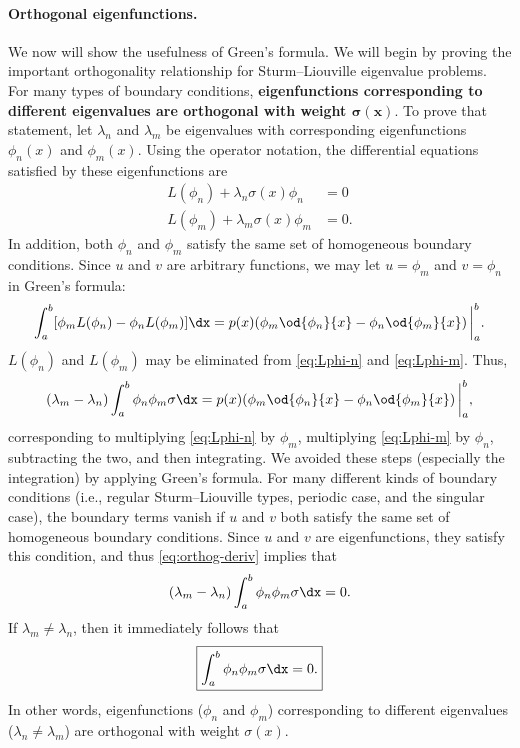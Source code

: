 \paragraph{Orthogonal eigenfunctions.}
We now will show the usefulness of Green's formula.  We will begin by proving the important orthogonality relationship for Sturm--Liouville eigenvalue problems.  For many types of boundary conditions, \textbf{eigenfunctions corresponding to different eigenvalues are orthogonal with weight $\bm{\sigma(x)}$}.  To prove that statement, let $\lambda_n$ and $\lambda_m$ be eigenvalues with corresponding eigenfunctions $\phi_n(x)$ and $\phi_m(x)$.  Using the operator notation, the differential equations satisfied by these eigenfunctions are
\begin{align}
\label{eq:Lphi-n}
L(\phi_n) + \lambda_n\sigma(x)\phi_n &= 0 \\
\label{eq:Lphi-m}
L(\phi_m) + \lambda_m\sigma(x)\phi_m &= 0.
\end{align}
In addition, both $\phi_n$ and $\phi_m$ satisfy the same set of homogeneous boundary conditions.  Since $u$ and $v$ are arbitrary functions, we may let $u = \phi_m$ and $v = \phi_n$ in Green's formula:
\[
\int_a^b [\phi_m L(\phi_n) - \phi_n L(\phi_m)]\dx = p(x)\!\left(\phi_m\od{\phi_n}{x} - \phi_n\od{\phi_m}{x}\right)\bigg|_a^b.
\]
$L(\phi_n)$ and $L(\phi_m)$ may be eliminated from \eqref{eq:Lphi-n} and \eqref{eq:Lphi-m}.  Thus,
\begin{equation}
\label{eq:orthog-deriv}
(\lambda_m - \lambda_n)\int_a^b \phi_n\phi_m\sigma\dx = p(x)\!\left(\phi_m\od{\phi_n}{x} - \phi_n\od{\phi_m}{x}\right)\bigg|_a^b,
\end{equation}
corresponding to multiplying \eqref{eq:Lphi-n} by $\phi_m$, multiplying \eqref{eq:Lphi-m} by $\phi_n$, subtracting the two, and then integrating.  We avoided these steps (especially the integration) by applying Green's formula.  For many different kinds of boundary conditions (i.e., regular Sturm--Liouville types, periodic case, and the singular case), the boundary terms vanish if $u$ and $v$ both satisfy the same set of homogeneous boundary conditions.  Since $u$ and $v$ are eigenfunctions, they satisfy this condition, and thus \eqref{eq:orthog-deriv} implies that
\begin{equation}
\label{eq:orthog-result}
(\lambda_m - \lambda_n)\int_a^b \phi_n\phi_m\sigma\dx = 0.
\end{equation}
If $\lambda_m \neq \lambda_n$, then it immediately follows that
\begin{equation}
\label{eq:orthogonality-proof}
\boxed{\int_a^b \phi_n\phi_m\sigma\dx = 0.}
\end{equation}
In other words, eigenfunctions ($\phi_n$ and $\phi_m$) corresponding to different eigenvalues ($\lambda_n \neq \lambda_m$) are orthogonal with weight $\sigma(x)$.

